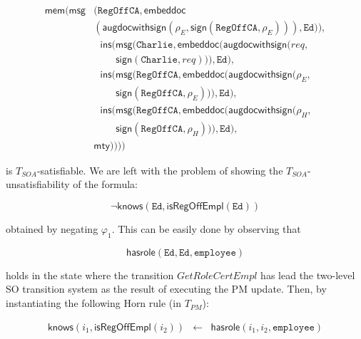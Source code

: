\documentclass[conference]{IEEEtran}
\begin{document}
\begin{LONG}
 \begin{small} \begin{align*}
  \mathsf{mem}(\mathsf{msg} & (\mathtt{RegOffCA}, \mathsf{embeddoc} \\
  & (\mathsf{augdocwithsign}(\rho_E, \mathsf{sign}(\mathtt{RegOffCA},\rho_E))),\mathtt{Ed})), \\  
  & ~~~\mathsf{ins}(\mathsf{msg}(\mathtt{Charlie},\mathsf{embeddoc} (\mathsf{augdocwithsign}(req, \\
  & ~~~~~~~~~~ \mathsf{sign}(\mathtt{Charlie},req))), \mathtt{Ed}),\\
  & ~~~\mathsf{ins}(\mathsf{msg}(\mathtt{RegOffCA},\mathsf{embeddoc} (\mathsf{augdocwithsign}(\rho_E, \\
  & ~~~~~~~~~~\mathsf{sign}(\mathtt{RegOffCA},\rho_E))), \mathtt{Ed}), \\
  & ~~~\mathsf{ins}(\mathsf{msg}(\mathtt{RegOffCA}, \mathsf{embeddoc}(\mathsf{augdocwithsign}(\rho_H, \\
  & ~~~~~~~~~~\mathsf{sign}(\mathtt{RegOffCA},\rho_H))), \mathtt{Ed}), \\
  & \mathsf{mty}))))
  \end{align*}\end{small}

\noindent
  is $T_\mathit{SOA}$-satisfiable.  We are left with the problem of showing
  the $T_\mathit{SOA}$-unsatisfiability of the formula:
  \begin{small}\begin{equation*}
    \neg \mathsf{knows}(\mathtt{Ed}, \mathsf{isRegOffEmpl}(\mathtt{Ed}))
  \end{equation*}\end{small}

\noindent
  obtained by negating $\varphi_1$.  This can be easily done by
  observing that 

  \begin{small}\begin{equation*}
    \mathsf{hasrole}(\mathtt{Ed}, \mathtt{Ed}, \mathtt{employee})
  \end{equation*}\end{small}

\noindent
  holds in the state where the transition $\mathit{GetRoleCertEmpl}$ has
  lead the two-level SO transition system as the result of executing the PM update.
  Then, by instantiating the following Horn rule (in $T_\mathit{PM}$):

\begin{small}  \begin{eqnarray*}
    \mathsf{knows}(i_1,\mathsf{isRegOffEmpl}(i_2)) 
    & \leftarrow &
    \mathsf{hasrole}(i_1, i_2, \mathtt{employee})
  \end{eqnarray*}\end{small}


\end{LONG}
\end{document}

